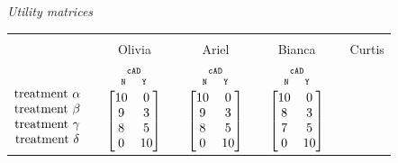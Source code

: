 \documentclass[utf8]{FrontiersinHarvard_mod} %
\renewcommand*{\|}[1][]{\nonscript\:#1\vert\nonscript\:\mathopen{}}
\newcommand*{\cad}{\texttt{cAD}}
\newcommand*{\yes}{\texttt{Y}}
\newcommand*{\no}{\texttt{N}}
\begin{document}
\medskip
\begin{table}[!h]
  \centering
  \textit{Utility matrices}\\
  \begin{tabular}{lccccccc}
    \hline\\[-1.5\jot]
    &{\small Olivia} &&{\small Ariel} &&{\small Bianca} &&{\small Curtis}
    \\[\jot]
    $\begin{matrix}&\\[1.5\jot]
      \text{treatment }\alpha\\ 
      \text{treatment }\beta\\ 
      \text{treatment }\gamma\\ 
      \text{treatment }\delta
    \end{matrix}$
    &
    $
    \begin{gathered}
      {\scriptstyle\cad}\\[-2\jot]
      \begin{smallmatrix}
        \no\enspace &\enspace\yes
      \end{smallmatrix}\\[-\jot]
\begin{bmatrix}10&0\\9&3\\8&5\\0&10\end{bmatrix}
\end{gathered}
$
    &&
    $\begin{gathered}
      {\scriptstyle\cad}\\[-2\jot]
      \begin{smallmatrix}
        \no\enspace &\enspace\yes
      \end{smallmatrix}\\[-\jot]
      \begin{bmatrix}10&0\\9&3\\8&5\\0&10\end{bmatrix}\end{gathered}$
    &&
    $\begin{gathered}
      {\scriptstyle\cad}\\[-2\jot]
      \begin{smallmatrix}
        \no\enspace &\enspace\yes
      \end{smallmatrix}\\[-\jot]
      \begin{bmatrix}10&0\\8&3\\7&5\\0&10\end{bmatrix}\end{gathered}$

\end{tabular}
\end{table}
\end{document}
